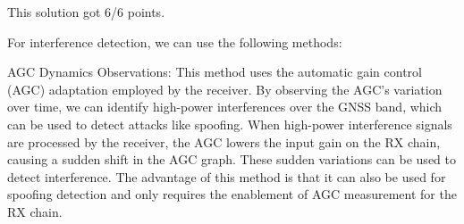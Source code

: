 \begin{questions}
{
    }


    \begin{solution}
        This solution got 6/6 points.

        For interference detection, we can use the following methods:

        AGC Dynamics Observations: This method uses the automatic gain control (AGC) adaptation employed by the receiver. By observing the AGC's variation over time, we can identify high-power interferences over the GNSS band, which can be used to detect attacks like spoofing. When high-power interference signals are processed by the receiver, the AGC lowers the input gain on the RX chain, causing a sudden shift in the AGC graph. These sudden variations can be used to detect interference. The advantage of this method is that it can also be used for spoofing detection and only requires the enablement of AGC measurement for the RX chain.


\end{solution}
\end{questions}
